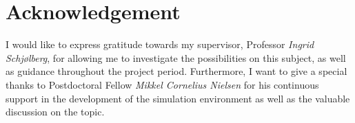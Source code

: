 \section*{Acknowledgement}
I would like to express gratitude towards my supervisor, Professor \textit{Ingrid Schjølberg}, for allowing me to investigate the possibilities on this subject, as well as guidance throughout the project period. Furthermore, I want to give a special thanks to Postdoctoral Fellow \textit{Mikkel Cornelius Nielsen} for his continuous support in the development of the simulation environment as well as the valuable discussion on the topic. 